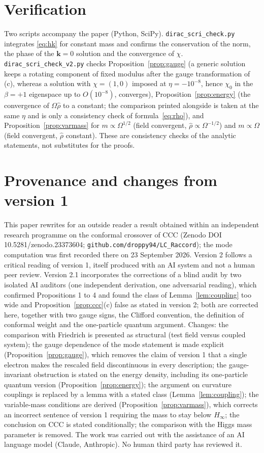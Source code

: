 \documentclass[11pt,a4paper]{article}
\theoremstyle{definition}
\begin{document}
\section*{Verification}
Two scripts accompany the paper (Python, SciPy). \texttt{dirac\_scri\_check.py} integrates \eqref{eq:hk} for constant mass and confirms the conservation of the norm, the phase of the $\mathbf{k}=0$ solution and the convergence of $\chi$. \texttt{dirac\_scri\_check\_v2.py} checks Proposition~\ref{prop:gauge} (a generic solution keeps a rotating component of fixed modulus after the gauge transformation of (c), whereas a solution with $\chi=(1,0)$ imposed at $\eta=-10^{-8}$, hence $\chi_{0}$ in the $\beta=+1$ eigenspace up to $O(10^{-8})$, converges), Proposition~\ref{prop:energy} (the convergence of $\Omega\hat\rho$ to a constant; the comparison printed alongside is taken at the same $\eta$ and is only a consistency check of formula~\eqref{eq:rho}), and Proposition~\ref{prop:varmass} for $m\propto\Omega^{1/2}$ (field convergent, $\hat\rho\propto\Omega^{-1/2}$) and $m\propto\Omega$ (field convergent, $\hat\rho$ constant). These are consistency checks of the analytic statements, not substitutes for the proofs.

\section*{Provenance and changes from version 1}
This paper rewrites for an outside reader a result obtained within an independent research programme on the conformal crossover of CCC (Zenodo DOI 10.5281/zenodo.23373604; \texttt{github.com/droppy94/LC\_Raccord}); the mode computation was first recorded there on 23 September 2026. Version 2 follows a critical reading of version 1, itself produced with an AI system and not a human peer review. Version 2.1 incorporates the corrections of a blind audit by two isolated AI auditors (one independent derivation, one adversarial reading), which confirmed Propositions 1 to 4 and found the class of Lemma~\ref{lem:coupling} too wide and Proposition~\ref{prop:ccc}(c) false as stated in version 2; both are corrected here, together with two gauge signs, the Clifford convention, the definition of conformal weight and the one-particle quantum argument. Changes: the comparison with Friedrich is presented as structural (test field versus coupled system); the gauge dependence of the mode statement is made explicit (Proposition~\ref{prop:gauge}), which removes the claim of version 1 that a single electron makes the rescaled field discontinuous in every description; the gauge-invariant obstruction is stated on the energy density, including its one-particle quantum version (Proposition~\ref{prop:energy}); the argument on curvature couplings is replaced by a lemma with a stated class (Lemma~\ref{lem:coupling}); the variable-mass conditions are derived (Proposition~\ref{prop:varmass}), which corrects an incorrect sentence of version 1 requiring the mass to stay below $H_{\infty}$; the conclusion on CCC is stated conditionally; the comparison with the Higgs mass parameter is removed. The work was carried out with the assistance of an AI language model (Claude, Anthropic). No human third party has reviewed it.
\end{document}
